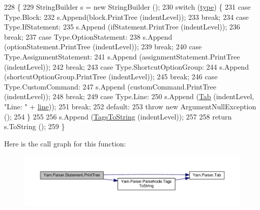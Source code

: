\begin{DoxyCode}
228             \{
229                 StringBuilder s = \textcolor{keyword}{new} StringBuilder ();
230                 \textcolor{keywordflow}{switch} (\hyperlink{a00166_aa3fa0eb260e412720562ce06b7dc06fe}{type}) \{
231                 \textcolor{keywordflow}{case} Type.Block:
232                     s.Append(block.PrintTree (indentLevel));
233                     \textcolor{keywordflow}{break};
234                 \textcolor{keywordflow}{case} Type.IfStatement:
235                     s.Append (ifStatement.PrintTree (indentLevel));
236                     \textcolor{keywordflow}{break};
237                 \textcolor{keywordflow}{case} Type.OptionStatement:
238                     s.Append (optionStatement.PrintTree (indentLevel));
239                     \textcolor{keywordflow}{break};
240                 \textcolor{keywordflow}{case} Type.AssignmentStatement:
241                     s.Append (assignmentStatement.PrintTree (indentLevel));
242                     \textcolor{keywordflow}{break};
243                 \textcolor{keywordflow}{case} Type.ShortcutOptionGroup:
244                     s.Append (shortcutOptionGroup.PrintTree (indentLevel));
245                     \textcolor{keywordflow}{break};
246                 \textcolor{keywordflow}{case} Type.CustomCommand:
247                     s.Append (customCommand.PrintTree (indentLevel));
248                     \textcolor{keywordflow}{break};
249                 \textcolor{keywordflow}{case} Type.Line:
250                     s.Append (\hyperlink{a00149_aa8fa36b46de12a1c561d77b99c4b9ae3}{Tab} (indentLevel, \textcolor{stringliteral}{"Line: "} + \hyperlink{a00166_a37695c7b00776bb292fd64894a70fb72}{line}));
251                     \textcolor{keywordflow}{break};
252                 \textcolor{keywordflow}{default}:
253                     \textcolor{keywordflow}{throw} \textcolor{keyword}{new} ArgumentNullException ();
254                 \}
255 
256                 s.Append (\hyperlink{a00148_a054f36c80d5eeacd569a8859f599af67}{TagsToString} (indentLevel));
257 
258                 \textcolor{keywordflow}{return} s.ToString ();
259             \}
\end{DoxyCode}


Here is the call graph for this function\-:
\nopagebreak
\begin{figure}[H]
\begin{center}
\leavevmode
\includegraphics[width=350pt]{a00166_aaac6d1e0c3b31f33e1c6f964c205153e_cgraph}
\end{center}
\end{figure}


